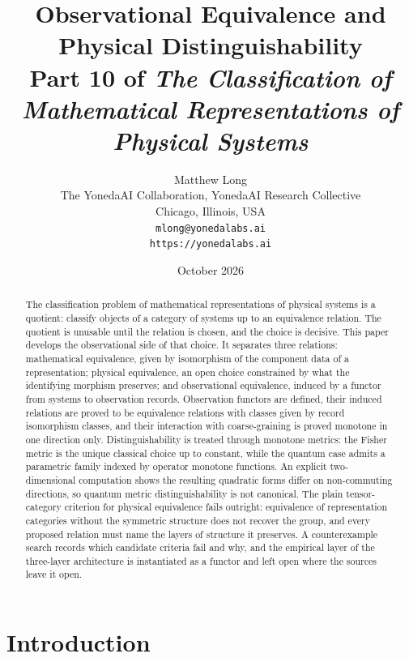 \documentclass[11pt,letterpaper]{article}
\title{Observational Equivalence and Physical Distinguishability\\[4pt]
  {\normalsize Part 10 of \emph{The Classification of Mathematical Representations of Physical Systems}}}
\author{Matthew Long\\
  \small The YonedaAI Collaboration, YonedaAI Research Collective\\
  \small Chicago, Illinois, USA\\
  \small \texttt{mlong@yonedalabs.ai}\\
  \small \texttt{https://yonedalabs.ai}}
\date{October 2026}
\theoremstyle{definition}
\theoremstyle{remark}
\begin{document}
\maketitle

\begin{abstract}
The classification problem of mathematical representations of physical systems is a quotient: classify objects of a category of systems up to an equivalence relation. The quotient is unusable until the relation is chosen, and the choice is decisive. This paper develops the observational side of that choice. It separates three relations: mathematical equivalence, given by isomorphism of the component data of a representation; physical equivalence, an open choice constrained by what the identifying morphism preserves; and observational equivalence, induced by a functor from systems to observation records. Observation functors are defined, their induced relations are proved to be equivalence relations with classes given by record isomorphism classes, and their interaction with coarse-graining is proved monotone in one direction only. Distinguishability is treated through monotone metrics: the Fisher metric is the unique classical choice up to constant, while the quantum case admits a parametric family indexed by operator monotone functions. An explicit two-dimensional computation shows the resulting quadratic forms differ on non-commuting directions, so quantum metric distinguishability is not canonical. The plain tensor-category criterion for physical equivalence fails outright: equivalence of representation categories without the symmetric structure does not recover the group, and every proposed relation must name the layers of structure it preserves. A counterexample search records which candidate criteria fail and why, and the empirical layer of the three-layer architecture is instantiated as a functor and left open where the sources leave it open.
\end{abstract}

\section{Introduction}
\end{document}
